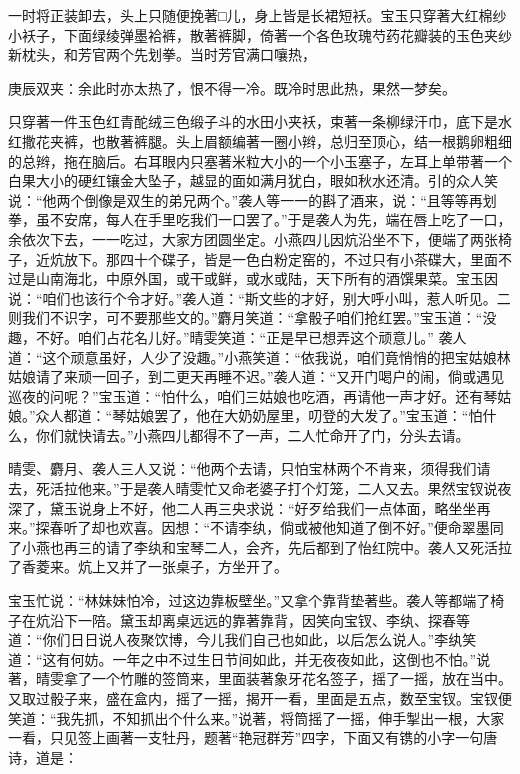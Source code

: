 \begin{parag}
    一时将正装卸去，头上只随便挽著□儿，身上皆是长裙短袄。宝玉只穿著大红棉纱小袄子，下面绿绫弹墨袷裤，散著裤脚，倚著一个各色玫瑰芍药花瓣装的玉色夹纱新枕头，和芳官两个先划拳。当时芳官满口嚷热，\begin{note}庚辰双夹：余此时亦太热了，恨不得一冷。既冷时思此热，果然一梦矣。\end{note}只穿著一件玉色红青酡绒三色缎子斗的水田小夹袄，束著一条柳绿汗巾，底下是水红撒花夹裤，也散著裤腿。头上眉额编著一圈小辫，总归至顶心，结一根鹅卵粗细的总辫，拖在脑后。右耳眼内只塞著米粒大小的一个小玉塞子，左耳上单带著一个白果大小的硬红镶金大坠子，越显的面如满月犹白，眼如秋水还清。引的众人笑说：“他两个倒像是双生的弟兄两个。”袭人等一一的斟了酒来，说：“且等等再划拳，虽不安席，每人在手里吃我们一口罢了。”于是袭人为先，端在唇上吃了一口，余依次下去，一一吃过，大家方团圆坐定。小燕四儿因炕沿坐不下，便端了两张椅子，近炕放下。那四十个碟子，皆是一色白粉定窑的，不过只有小茶碟大，里面不过是山南海北，中原外国，或干或鲜，或水或陆，天下所有的酒馔果菜。宝玉因说：“咱们也该行个令才好。”袭人道：“斯文些的才好，别大呼小叫，惹人听见。二则我们不识字，可不要那些文的。”麝月笑道：“拿骰子咱们抢红罢。”宝玉道：“没趣，不好。咱们占花名儿好。”晴雯笑道：“正是早已想弄这个顽意儿。” 袭人道：“这个顽意虽好，人少了没趣。”小燕笑道：“依我说，咱们竟悄悄的把宝姑娘林姑娘请了来顽一回子，到二更天再睡不迟。”袭人道：“又开门喝户的闹，倘或遇见巡夜的问呢？”宝玉道：“怕什么，咱们三姑娘也吃酒，再请他一声才好。还有琴姑娘。”众人都道：“琴姑娘罢了，他在大奶奶屋里，叨登的大发了。”宝玉道：“怕什么，你们就快请去。”小燕四儿都得不了一声，二人忙命开了门，分头去请。
\end{parag}


\begin{parag}
    晴雯、麝月、袭人三人又说：“他两个去请，只怕宝林两个不肯来，须得我们请去，死活拉他来。”于是袭人晴雯忙又命老婆子打个灯笼，二人又去。果然宝钗说夜深了，黛玉说身上不好，他二人再三央求说：“好歹给我们一点体面，略坐坐再来。”探春听了却也欢喜。因想：“不请李纨，倘或被他知道了倒不好。”便命翠墨同了小燕也再三的请了李纨和宝琴二人，会齐，先后都到了怡红院中。袭人又死活拉了香菱来。炕上又并了一张桌子，方坐开了。
\end{parag}


\begin{parag}
    宝玉忙说：“林妹妹怕冷，过这边靠板壁坐。”又拿个靠背垫著些。袭人等都端了椅子在炕沿下一陪。黛玉却离桌远远的靠著靠背，因笑向宝钗、李纨、探春等道：“你们日日说人夜聚饮博，今儿我们自己也如此，以后怎么说人。”李纨笑道：“这有何妨。一年之中不过生日节间如此，并无夜夜如此，这倒也不怕。”说著，晴雯拿了一个竹雕的签筒来，里面装著象牙花名签子，摇了一摇，放在当中。又取过骰子来，盛在盒内，摇了一摇，揭开一看，里面是五点，数至宝钗。宝钗便笑道：“我先抓，不知抓出个什么来。”说著，将筒摇了一摇，伸手掣出一根，大家一看，只见签上画著一支牡丹，题著“艳冠群芳”四字，下面又有镌的小字一句唐诗，道是：
\end{parag}


